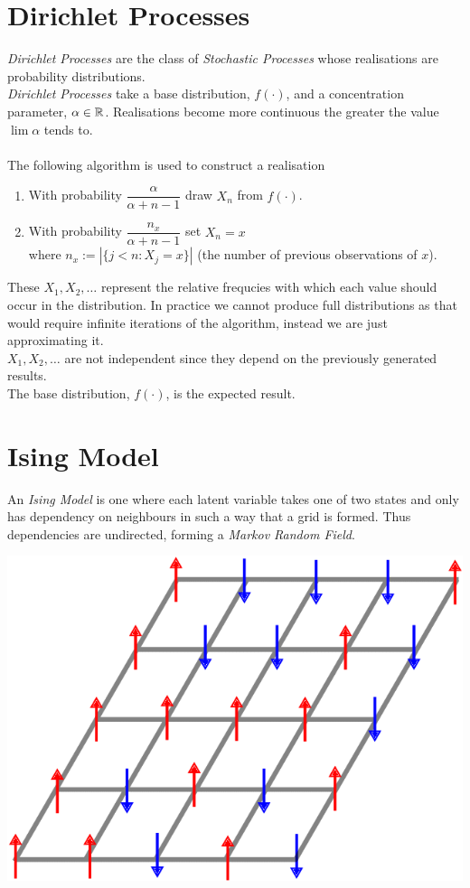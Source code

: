 \documentclass[11pt,a4paper]{article}
\begin{document}
\section{Dirichlet Processes}
\textit{Dirichlet Processes} are the class of \textit{Stochastic Processes} whose realisations are probability distributions.\\
\textit{Dirichlet Processes} take a base distribution, $f(\cdot)$, and a concentration parameter, $\alpha\in\mathbb{R}$. Realisations become more continuous the greater the value $\lim\alpha$ tends to.\\
\\
The following algorithm is used to construct a realisation
\begin{enumerate}
	\item With probability $\dfrac\alpha{\alpha+n-1}$ draw $X_n$ from $f(\cdot)$.
	\item With probability $\dfrac{n_x}{\alpha+n-1}$ set $X_n=x$\\
	 where $n_x:=|\{j<n:X_j=x\}|$ (\ie the number of previous observations of $x$).
\end{enumerate}
These $X_1,X_2,\dots$ represent the relative frequcies with which each value should occur in the distribution. In practice we cannot produce full distributions as that would require infinite iterations of the algorithm, instead we are just approximating it.\\
\nb $X_1,X_2,\dots$ are not independent since they depend on the previously generated results.\\
\nb The base distribution, $f(\cdot)$, is the expected result.

\section{Ising Model}
An \textit{Ising Model} is one where each latent variable takes one of two states and only has dependency on neighbours in such a way that a grid is formed. Thus dependencies are undirected, forming a \textit{Markov Random Field}.
\begin{center}\includegraphics[scale=.2]{img/ising.png}\end{center}
\end{document}
